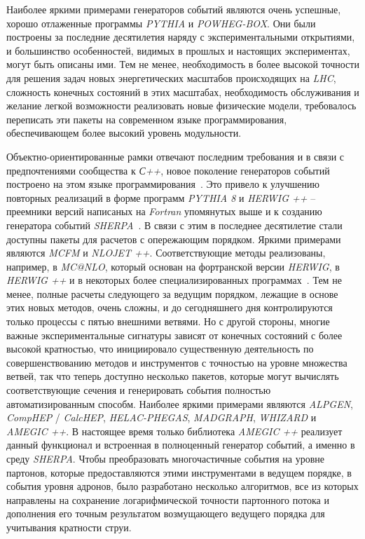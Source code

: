 Наиболее яркими примерами генераторов событий являются очень успешные, хорошо отлаженные программы
\textit{PYTHIA} и \textit{POWHEG-BOX}. Они были построены за последние десятилетия наряду с экспериментальными открытиями, и большинство особенностей, видимых в прошлых и настоящих экспериментах, могут быть описаны
ими. Тем не менее, необходимость в более высокой точности для решения задач новых энергетических масштабов происходящих
на \textit{LHC}, сложность конечных состояний в этих масштабах, необходимость обслуживания и желание легкой возможности реализовать новые физические модели, требовалось переписать эти пакеты на современном языке программирования, обеспечивающем более высокий уровень модульности.

Объектно-ориентированные рамки отвечают последним
требования и в связи с предпочтениями сообщества к \textit{С++}, новое поколение генераторов событий
построено на этом языке программирования~\cite{review-sherpa}. Это привело к улучшению повторных реализаций в форме
программ \textit{PYTHIA 8} и \textit{HERWIG ++} -- преемники версий написаных на \textit{Fortran} упомянутых выше
и к созданию генератора событий \textit{SHERPA}~\cite{review-sherpa}.
В связи с этим в последнее десятилетие стали доступны пакеты для расчетов с опережающим порядком. Яркими примерами являются \textit{MCFM} и \textit{NLOJET ++}. Соответствующие методы реализованы, например, в \textit{MC@NLO}, который основан
на фортранской версии \textit{HERWIG}, в \textit{HERWIG ++} и в некоторых более специализированных программах~\cite{review-sherpa}.
Тем не менее, полные расчеты следующего за ведущим порядком, лежащие в основе этих новых методов, очень сложны, и до сегодняшнего дня контролируются только процессы с пятью внешними ветвями. Но
с другой стороны, многие важные экспериментальные сигнатуры зависят от конечных состояний с более высокой кратностью, что
инициировало существенную деятельность по совершенствованию методов и инструментов с точностью на уровне множества ветвей, так что
теперь доступно несколько пакетов, которые могут вычислять соответствующие сечения и генерировать события
полностью автоматизированным способм. Наиболее яркими примерами являются \textit{ALPGEN}, \textit{CompHEP} / \textit{CalcHEP},
\textit{HELAC-PHEGAS}, \textit{MADGRAPH}, \textit{WHIZARD} и \textit{AMEGIC ++}. В настоящее время только библиотека \textit{AMEGIC ++} реализует данный функционал и встроенная в полноценный генератор событий, а именно в среду \textit{SHERPA}. Чтобы
преобразовать многочастичные события на уровне партонов, которые предоставляются этими инструментами в ведущем порядке, в
события уровня адронов, было разработано несколько алгоритмов, все из которых направлены на сохранение логарифмической
точности партонного потока и дополнения его точным результатом возмущающего ведущего порядка для
учитывания кратности струи.

